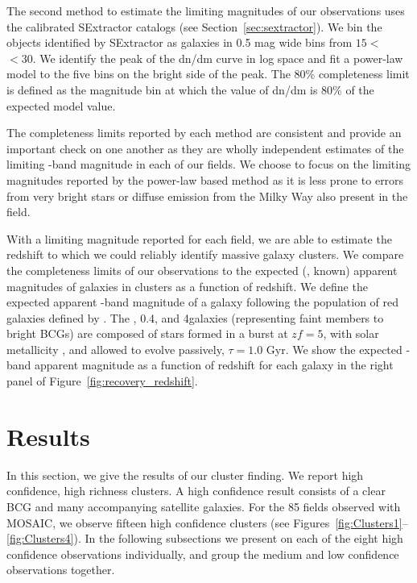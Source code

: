\documentclass[apj, revtex4-1]{emulateapj}
\begin{document}
The second method to estimate the limiting magnitudes of our observations uses the calibrated SExtractor catalogs (see Section~\ref{sec:sextractor}). We bin the objects identified by SExtractor as galaxies in 0.5 mag wide bins from $15<$ \sdssi\ $<30$. We identify the peak of the dn/dm curve in log space and fit a power-law model to the five bins on the bright side of the peak. The 80\% completeness limit is defined as the magnitude bin at which the value of dn/dm is 80\% of the expected model value.

The completeness limits reported by each method are consistent and provide an important check on one another as they are wholly independent estimates of the limiting \sdssi-band magnitude in each of our fields. We choose to focus on the limiting magnitudes reported by the power-law based method as it is less prone to errors from very bright stars or diffuse emission from the Milky Way also present in the field.

With a limiting magnitude reported for each field, we are able to estimate the redshift to which we could reliably identify massive galaxy clusters. We compare the completeness limits of our observations to the expected (\ie, known) apparent magnitudes of galaxies in clusters as a function of redshift. We define the expected apparent \sdssi-band magnitude of a galaxy following the population of red galaxies defined by \cite{Blanton2003}. The \lstar, 0.4\lstar, and 4\lstar galaxies (representing faint members to bright BCGs) are composed of stars formed in a burst at $zf = 5$, with solar metallicity \citep{Bruzual2003}, and allowed to evolve passively, $\tau = 1.0$ Gyr. We show the expected \sdssi-band apparent magnitude as a function of redshift for each galaxy in the right panel of Figure~\ref{fig:recovery_redshift}.

\section{Results}\label{sec:results}
In this section, we give the results of our cluster finding. We report high confidence, high richness clusters. A high confidence result consists of a clear BCG and many accompanying satellite galaxies. For the 85 fields observed with MOSAIC, we observe fifteen high confidence clusters (see Figures~\ref{fig:Clusters1}--\ref{fig:Clusters4}). In the following subsections we present on each of the eight high confidence observations individually, and group the medium and low confidence observations together.
\end{document}
